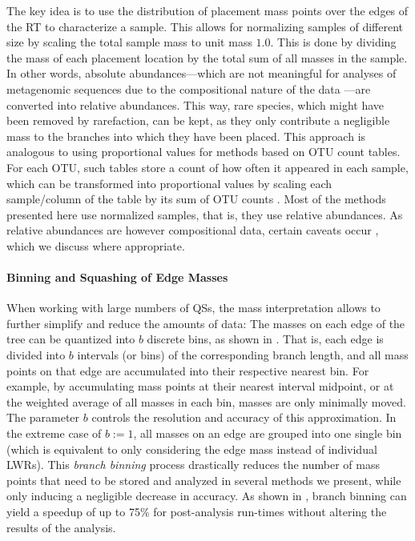 The key idea is to use the distribution of placement mass points over the edges of the \ac{RT} to characterize a sample.
This allows for normalizing samples of different size by scaling the total sample mass to unit mass $1.0$.
This is done by dividing the mass of each placement location by the total sum of all masses in the sample.
In other words, absolute abundances---which are not meaningful for analyses
of metagenomic sequences due to the compositional nature of the data \cite{Gloor2017}---are converted into relative abundances.
This way, rare species, which might have been removed by rarefaction, can be kept,
as they only contribute a negligible mass to the branches into which they have been placed.
This approach is analogous to using proportional values for methods based on OTU count tables.
For each OTU, such tables store a count of how often it appeared in each sample,
which can be transformed into proportional values
by scaling each sample/column of the table by its sum of OTU counts \cite{Weiss2017}.
Most of the methods presented here use normalized samples, that is, they use relative abundances.
As relative abundances are however compositional data, certain caveats occur \cite{Aitchison1986,Lovell2015,Gloor2016},
which we discuss where appropriate.

\paragraph{Binning and Squashing of Edge Masses}
\label{ch:Foundations:sec:PhylogeneticPlacement:sub:PlacementProcessing:par:BinningSquashing}

When working with large numbers of \acp{QS},
the mass interpretation allows to further simplify and reduce the amounts of data:
The masses on each edge of the tree can be quantized into $b$ discrete bins, as shown in .
That is, each edge is divided into $b$ intervals (or bins) of the corresponding branch length,
and all mass points on that edge are accumulated into their respective nearest bin.
For example, by accumulating mass points at their nearest interval midpoint,
or at the weighted average of all masses in each bin, masses are only minimally moved.
The parameter $b$ controls the resolution and accuracy of this approximation.
In the extreme case of $b:=1$, all masses on an edge are grouped into one single bin
(which is equivalent to only considering the edge mass instead of individual \acp{LWR}).
This \emph{branch binning} process drastically reduces the number of mass points
that need to be stored and analyzed in several methods we present,
while only inducing a negligible decrease in accuracy.
As shown in ,
branch binning can yield a speedup of up to 75\% for post-analysis run-times without altering the results of the analysis.

